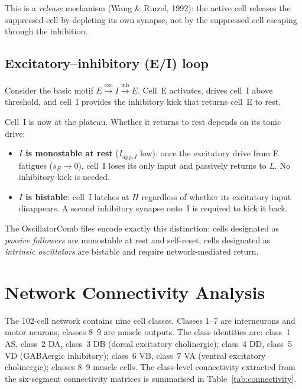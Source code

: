 \documentclass[11pt]{article}
\begin{document}
This is a \emph{release} mechanism (Wang \& Rinzel, 1992): the active cell releases the suppressed
cell by depleting its own synapse, not by the suppressed cell escaping through the inhibition.

\subsection{Excitatory–inhibitory (E/I) loop}

Consider the basic motif $E \xrightarrow{\mathrm{exc}} I \xrightarrow{\mathrm{inh}} E$.
Cell~E activates, drives cell~I above threshold, and cell~I provides the inhibitory kick that
returns cell~E to rest.

Cell~I is now at the plateau.  Whether it returns to rest depends on its tonic drive:
\begin{itemize}
    \item \textbf{$I$ is monostable at rest} ($I_{\mathrm{app},I}$ low): once the excitatory
          drive from E fatigues ($s_E \to 0$), cell~I loses its only input and passively returns
          to $L$.  No inhibitory kick is needed.
    \item \textbf{$I$ is bistable}: cell~I latches at $H$ regardless of whether its excitatory
          input disappears.  A second inhibitory synapse onto~I is required to kick it back.
\end{itemize}

The OscillatorComb files encode exactly this distinction: cells designated as \emph{passive
followers} are monostable at rest and self-reset; cells designated as \emph{intrinsic oscillators}
are bistable and require network-mediated return.

\section{Network Connectivity Analysis}
\label{sec:connectivity}

The 102-cell network contains nine cell classes.  Classes 1--7 are interneurons and motor neurons;
classes 8--9 are muscle outputs.  The class identities are: class~1 AS, class~2 DA, class~3 DB
(dorsal excitatory cholinergic); class~4 DD, class~5 VD (GABAergic inhibitory); class~6 VB,
class~7 VA (ventral excitatory cholinergic); classes 8--9 muscle cells.  The class-level
connectivity extracted from the six-segment connectivity matrices is summarised in
Table~\ref{tab:connectivity}.
\end{document}
